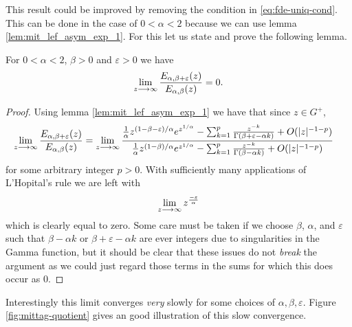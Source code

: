 This result could be improved by removing the condition  in \eqref{eq:fde-uniq-cond}. This can be done in the case of $ 0 < \alpha < 2 $ because we can use lemma \ref{lem:mit_lef_asym_exp_1}. For this let us state and prove the following lemma.

\begin{mdframed}[innertopmargin=10pt]
\begin{lemma}
	\label{lem:mit_lef_quotient}
	For $ 0 < \alpha < 2 $, $ \beta > 0 $ and $ \varepsilon > 0 $ we have
	\begin{align}
		\lim_{z \longrightarrow \infty} \frac{E_{\alpha, \beta + \varepsilon}(z)}{E_{\alpha, \beta}(z)} = 0.
	\end{align}
\end{lemma}
\end{mdframed}

\begin{proof}
	Using lemma \ref{lem:mit_lef_asym_exp_1} we have that since $ z \in G^+ $,
	\begin{align*}
		\lim_{z \longrightarrow \infty} \frac{E_{\alpha, \beta + \varepsilon}(z)}{E_{\alpha, \beta}(z)} &= \lim_{z \longrightarrow \infty}\frac{\frac{1}{\alpha} z^{(1 - \beta - \varepsilon) / \alpha} e^{z^{1/\alpha}} - \sum_{k=1}^p \frac{z^{-k}}{\Gamma(\beta + \varepsilon - \alpha k)} + O(|z|^{-1-p})}{\frac{1}{\alpha} z^{(1 - \beta) / \alpha} e^{z^{1/\alpha}} - \sum_{k=1}^p \frac{z^{-k}}{\Gamma(\beta - \alpha k)} + O(|z|^{-1-p})}
	\end{align*}
	for some arbitrary integer $ p > 0 $.
	With sufficiently many applications of L'Hopital's rule we are left with
	\begin{align*}
		\lim_{z\longrightarrow\infty} z^{\frac{-\varepsilon}{\alpha}}		
	\end{align*}
	which is clearly equal to zero.
	Some care must be taken if we choose $ \beta $, $ \alpha $, and $ \varepsilon $ such that $ \beta - \alpha k $ or $ \beta + \varepsilon - \alpha k $ are ever integers due to singularities in the Gamma function, but it should be clear that these issues do not \emph{break} the argument as we could just regard those terms in the sums for which this does occur as $ 0 $.
\end{proof}

Interestingly this limit converges \emph{very} slowly for some choices of $ \alpha, \beta, \varepsilon $. Figure \ref{fig:mittag-quotient} gives an good illustration of this slow convergence.

